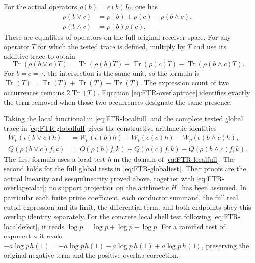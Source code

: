 For the actual operators $\rho(b)=\epsilon(b)I_V$, one has
\begin{equation}\tag{FTR29}\label{eq:FTR-overlapoperator}
 \begin{aligned}
 \rho(b\vee c)&=\rho(b)+\rho(c)-\rho(b\wedge c),\\
 \rho(b\wedge c)&=\rho(b)\rho(c).
 \end{aligned}
\end{equation}
These are equalities of operators on the full original receiver
space. For any operator $T$ for which the tested trace is
defined, multiply by $T$ and use its additive trace to obtain
\begin{equation}\tag{FTR30}\label{eq:FTR-overlaptrace}
 \operatorname{Tr}(\rho(b\vee c)T)
 =\operatorname{Tr}(\rho(b)T)+\operatorname{Tr}(\rho(c)T)
                  -\operatorname{Tr}(\rho(b\wedge c)T).
\end{equation}
For $b=c=\tau$, the intersection is the same unit, so the
formula is $\operatorname{Tr}(T)=\operatorname{Tr}(T)
+\operatorname{Tr}(T)-\operatorname{Tr}(T)$.
The expression count of two occurrences remains
$2\operatorname{Tr}(T)$. Equation
\eqref{eq:FTR-overlaptrace} identifies exactly the term removed
when those two occurrences designate the same presence.

Taking the local functional in \eqref{eq:FTR-localfull} and the
complete tested global trace in \eqref{eq:FTR-globalfull} gives
the constructive arithmetic identities
\begin{equation}\tag{FTR31}\label{eq:FTR-overlaparithmetic}
 \begin{aligned}
 W_p(\epsilon(b\vee c)h)
 &=W_p(\epsilon(b)h)+W_p(\epsilon(c)h)
                       -W_p(\epsilon(b\wedge c)h),\\
 Q(\rho(b\vee c)f,k)
 &=Q(\rho(b)f,k)+Q(\rho(c)f,k)
                       -Q(\rho(b\wedge c)f,k).
 \end{aligned}
\end{equation}
The first formula uses a local test $h$ in the domain of
\eqref{eq:FTR-localfull}. The second holds for the full global
tests in \eqref{eq:FTR-globaltest}. Their proofs are the actual
linearity and sesquilinearity proved above, together with
\eqref{eq:FTR-overlapscalar}; no support projection on the
arithmetic $H^1$ has been assumed.
In particular each finite prime coefficient, each conductor
summand, the full real cutoff expression and its limit, the
differential term, and both endpoints obey this overlap identity
separately. For the concrete local shell test following
\eqref{eq:FTR-localdefect}, it reads
$\log p=\log p+\log p-\log p$.
For a ramified test of exponent $a$ it reads
$-a\log p\,h(1)=-a\log p\,h(1)-a\log p\,h(1)
+a\log p\,h(1)$, preserving the original negative term and
the positive overlap correction.


